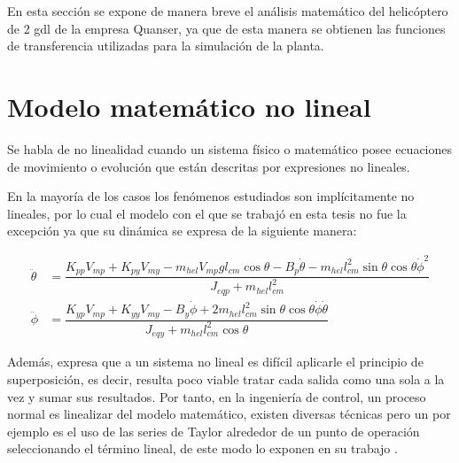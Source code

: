 \label{app:model math}

En esta sección se expone de manera breve el análisis matemático del helicóptero de 2 \gls{gdl} de la empresa Quanser, ya que de esta manera se obtienen las funciones de transferencia utilizadas para la simulación de la planta.

\section{Modelo matemático no lineal}

Se habla de no linealidad cuando un sistema físico o matemático posee ecuaciones de movimiento o evolución que están descritas por expresiones no lineales.

En la mayoría de los casos los fenómenos estudiados son implícitamente no lineales, por lo cual el modelo con el que se trabajó en esta tesis no fue la excepción ya que su dinámica se expresa de la siguiente manera:

\begin{align}
   \label{equa:ddot-theta2}
   \ddot{\theta} &= \dfrac{K_{pp}V_{mp}+K_{py}V_{my}-m_{hel}V_{mp}gl_{cm}\cos\theta - B_p\dot{\theta}- m_{hel}l_{cm}^2\sin\theta\cos\theta\dot{\phi}^2} {J_{eqp}+m_{hel}l_{cm}^2} \\
   \label{equa:ddot-phi2}
   \ddot{\phi} &= \dfrac{K_{yp}V_{mp}+K_{yy}V_{my}-B_y\dot{\phi}+2m_{hel}l_{cm}^2\sin\theta\cos\theta\dot{\phi}\dot{\theta}} {J_{eqy}+m_{hel}l_{cm}^2\cos\theta}
\end{align}

Además, \citet[pp. 42-43]{Ogata2010} expresa que a un sistema no lineal es difícil aplicarle el principio de superposición, es decir, resulta poco viable tratar cada salida como una sola a la vez y sumar sus resultados. Por tanto, en la ingeniería de control, un proceso normal es linealizar del modelo matemático, existen diversas técnicas pero un por ejemplo es el uso de las series de Taylor alrededor de un punto de operación seleccionando el término lineal, de este modo lo exponen en su trabajo \citet{VillarealGrajales2017}.